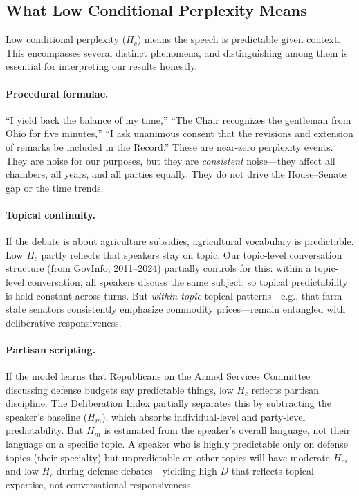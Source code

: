 \documentclass[12pt]{article}
\newcommand{\Hc}{H_c}
\newcommand{\Hm}{H_m}
\newcommand{\DI}{\mathit{D}}
\begin{document}
\subsection{What Low Conditional Perplexity Means}

Low conditional perplexity ($\Hc$) means the speech is predictable given context. This encompasses several distinct phenomena, and distinguishing among them is essential for interpreting our results honestly.

\paragraph{Procedural formulae.} ``I yield back the balance of my time,'' ``The Chair recognizes the gentleman from Ohio for five minutes,'' ``I ask unanimous consent that the revisions and extension of remarks be included in the Record.'' These are near-zero perplexity events. They are noise for our purposes, but they are \textit{consistent} noise---they affect all chambers, all years, and all parties equally. They do not drive the House--Senate gap or the time trends.

\paragraph{Topical continuity.} If the debate is about agriculture subsidies, agricultural vocabulary is predictable. Low $\Hc$ partly reflects that speakers stay on topic. Our topic-level conversation structure (from GovInfo, 2011--2024) partially controls for this: within a topic-level conversation, all speakers discuss the same subject, so topical predictability is held constant across turns. But \textit{within-topic} topical patterns---e.g., that farm-state senators consistently emphasize commodity prices---remain entangled with deliberative responsiveness.

\paragraph{Partisan scripting.} If the model learns that Republicans on the Armed Services Committee discussing defense budgets say predictable things, low $\Hc$ reflects partisan discipline. The Deliberation Index partially separates this by subtracting the speaker's baseline ($\Hm$), which absorbs individual-level and party-level predictability. But $\Hm$ is estimated from the speaker's overall language, not their language on a specific topic. A speaker who is highly predictable only on defense topics (their specialty) but unpredictable on other topics will have moderate $\Hm$ and low $\Hc$ during defense debates---yielding high $\DI$ that reflects topical expertise, not conversational responsiveness.
\end{document}

